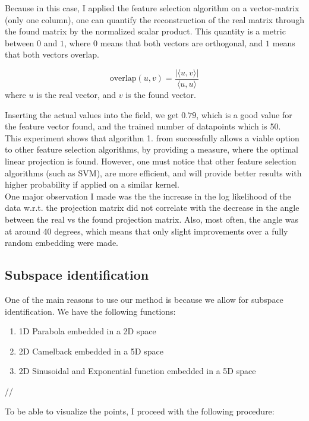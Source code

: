 Because in this case, I applied the feature selection algorithm on a vector-matrix (only one column), one can quantify the reconstruction of the real matrix through the found matrix by the normalized scalar product.
This quantity is a metric between $0$ and $1$, where $0$ means that both vectors are orthogonal, and $1$ means that both vectors overlap.

\begin{equation}
\text{overlap}(u, v) = \frac{| \langle u, v \rangle |}{\langle u, u \rangle}
\end{equation}
where $u$ is the real vector, and $v$ is the found vector.

Inserting the actual values into the field, we get $0.79$, which is a good value for the feature vector found, and the trained number of datapoints which is 50. \\
 
 This experiment shows that algorithm 1. from \citep{Tripathy} successfully allows a viable option to other feature selection algorithms, by providing a measure, where the optimal linear projection is found. 
 However, one must notice that other feature selection algorithms (such as SVM), are more efficient, and will provide better results with higher probability if applied on a similar kernel. \\
 
 One major observation I made was the the increase in the log likelihood of the data w.r.t. the projection matrix did not correlate with the decrease in the angle between the real vs the found projection matrix.
 Also, most often, the angle was at around 40 degrees, which means that only slight improvements over a fully random embedding were made.


\subsection{Subspace identification}
One of the main reasons to use our method is because we allow for subspace identification.
We have the following functions:

\begin{enumerate}
\item 1D Parabola embedded in a 2D space
\item 2D Camelback embedded in a 5D space
\item 2D Sinusoidal and Exponential function embedded in a 5D space
\end{enumerate} //

To be able to visualize the points, I proceed with the following procedure:

